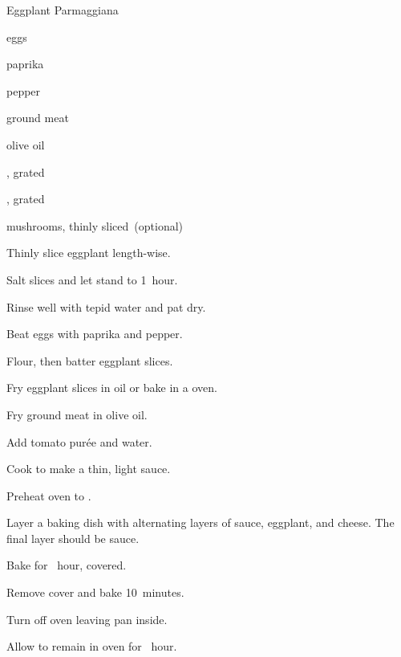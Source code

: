 \begin{recipe}{Eggplant Parmaggiana}{}{}

\begin{ingredients}
\item {}
\item eggs
\item paprika
\item pepper
\item ground meat
\item olive oil
\item {}
\item {}, grated
\item {}, grated
\item mushrooms, thinly sliced~(optional)
\end{ingredients}

\begin{directions}
\item Thinly slice eggplant length-wise.
\item Salt slices and let stand \half{} to 1~hour.
\item Rinse well with tepid water and pat dry.
\item Beat eggs with paprika and pepper.
\item Flour, then batter eggplant slices.
\item Fry eggplant slices in oil or bake in a  oven.
\item Fry ground meat in olive oil.
\item Add tomato purée and water.
\item Cook to make a thin, light sauce.
\item Preheat oven to .
\item Layer a baking dish with alternating layers of sauce, eggplant, and cheese. The final layer should be sauce.
\item Bake for \half~hour, covered.
\item Remove cover and bake 10~minutes.
\item Turn off oven leaving pan inside.
\item Allow to remain in oven for \half~hour.
\end{directions}

\end{recipe}
